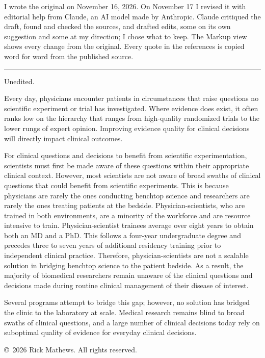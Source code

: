 \documentclass[12pt]{article}
\begin{document}
\clearpage
{\fontsize{11.7}{16.38}\selectfont\setlength{\parindent}{0pt}\setlength{\parskip}{6pt}
\par
I wrote the original on November 16, 2026. On November 17 I revised it with editorial help from Claude, an AI model made by Anthropic. Claude critiqued the draft, found and checked the sources, and drafted edits, some on its own suggestion and some at my direction; I chose what to keep. The Markup view shows every change from the original. Every quote in the references is copied word for word from the published source.\par
\vspace{10pt}
{\color{rule}\noindent\rule{\textwidth}{0.4pt}}\par
{} Unedited.\par
}
\fontsize{13.0}{18.85}\selectfont\setlength{\parskip}{6.5pt}
Every day, physicians encounter patients in circumstances that raise questions no scientific experiment or trial has investigated. Where evidence does exist, it often ranks low on the hierarchy that ranges from high-quality randomized trials to the lower rungs of expert opinion. Improving evidence quality for clinical decisions will directly impact clinical outcomes.

For clinical questions and decisions to benefit from scientific experimentation, scientists must first be made aware of these questions within their appropriate clinical context. However, most scientists are not aware of broad swaths of clinical questions that could benefit from scientific experiments. This is because physicians are rarely the ones conducting benchtop science and researchers are rarely the ones treating patients at the bedside. Physician-scientists, who are trained in both environments, are a minority of the workforce and are resource intensive to train. Physician-scientist trainees average over eight years to obtain both an MD and a PhD. This follows a four-year undergraduate degree and precedes three to seven years of additional residency training prior to independent clinical practice. Therefore, physician-scientists are not a scalable solution in bridging benchtop science to the patient bedside. As a result, the majority of biomedical researchers remain unaware of the clinical questions and decisions made during routine clinical management of their disease of interest.

Several programs attempt to bridge this gap; however, no solution has bridged the clinic to the laboratory at scale. Medical research remains blind to broad swaths of clinical questions, and a large number of clinical decisions today rely on suboptimal quality of evidence for everyday clinical decisions.


\vspace{10pt}
{\centering\footnotesize \copyright\ 2026 Rick Mathews. All rights reserved.\par}
\end{document}
